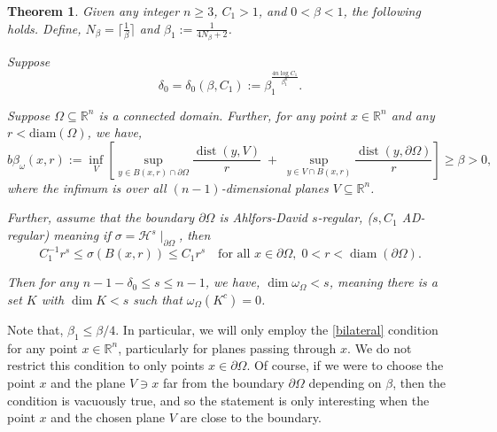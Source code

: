 \documentclass{article}
\theoremstyle{plain}
\theoremstyle{plain}
\newcommand{\R}{\mathbb{R}}
\newtheorem{theorem}{Theorem}[section]
\theoremstyle{definition}
\theoremstyle{plain}
\begin{document}
\begin{theorem}\label{mainthm}
Given any integer $n \geq 3$, $C_{1} > 1$, and $0<\beta <1$, the following holds. Define, $N_\beta =\lceil \frac{1}{\beta} \rceil$ and $\beta_1:= \frac{1}{4N_{\beta}+2}$.

 Suppose $$\delta_0=\delta_0(\beta,C_1):=\beta_1^{\frac{4n\log C_1}{\beta_{1}^n}}.$$
 
 
 Suppose $\Omega \subseteq \mathbb{R}^{n}$ is a connected
domain. Further, for any point $x\in \R^n$ and any $r< \text{diam}(\Omega)$, we have,
\begin{equation}\label{bilateral}
b\beta_{\omega}(x,r)
:= \inf_{V}\left[
\sup_{y \in B(x,r)\cap \partial \Omega} \frac{\operatorname{dist}(y,V)}{r}
\;+\;
\sup_{y\in V\cap B(x,r)} \frac{\operatorname{dist}(y,\partial\Omega)}{r}
\right]
\ge \beta > 0,
\end{equation}
where the infimum is over all $(n-1)$-dimensional planes $V \subseteq \mathbb{R}^{n}$.

Further, assume that the boundary $\partial\Omega$ is Ahlfors-David $s$-regular, ($s,C_1$ AD-regular) meaning if
$\sigma = \mathcal{H}^{s}\!\!\mid_{\partial\Omega}$, then
\begin{equation}\label{adr}
C_{1}^{-1} r^{s} \le \sigma(B(x,r)) \le C_{1} r^{s}
\quad \text{for all } x \in \partial\Omega,\; 0 < r < \operatorname{diam}(\partial\Omega).
\end{equation}




Then for any $n-1-\delta_0 \leq  s \leq n-1$, we have, $\dim \omega_\Omega <  s$, meaning there is a set $K$ with
$\dim K <  s$ such that $\omega_\Omega(K^{c}) = 0$.
\end{theorem}

Note that, $\beta_1\leq \beta/4$. In particular, we will only employ the \cref{bilateral} condition for any point $x\in\R^n$, particularly for planes passing through $x$. We do not restrict this condition to only points $x\in\partial\Omega$. Of course, if we were to choose the point $x$ and the plane $V\ni x$ far from the boundary $\partial\Omega$ depending on $\beta$, then the condition is vacuously true, and so the statement is only interesting when the point $x$ and the chosen plane $V$ are close to the boundary.
\end{document}
